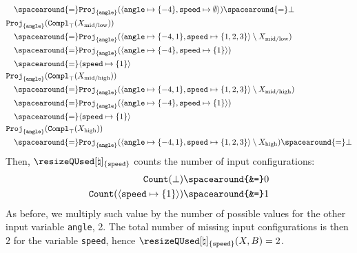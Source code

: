 \begin{example}
\begin{align*}
    &\quad\spacearound{=} \abstractdomainproject[{\{\texttt{angle}\}}](\langle \texttt{angle} \mapsto \{-4\}, \texttt{speed} \mapsto \emptyset\rangle) \spacearound{=}\abstractdomainbottom \\
    &\abstractdomainproject[{\{\texttt{angle}\}}](\abstractdomaincomplement_\abstractdomaintop(\prefrombucket[\textup{mid\-/low}])) \\
    &\quad\spacearound{=} \abstractdomainproject[{\{\texttt{angle}\}}](\langle \texttt{angle} \mapsto \{-4, 1\}, \texttt{speed} \mapsto \{1, 2, 3\} \rangle \setminus \prefrombucket[\textup{mid\-/low}]) \\
    &\quad\spacearound{=} \abstractdomainproject[{\{\texttt{angle}\}}](\langle \texttt{angle} \mapsto \{-4\}, \texttt{speed} \mapsto \{1\}\rangle) \\
    &\quad\spacearound{=} \langle \texttt{speed} \mapsto \{1\} \rangle \\
    &\abstractdomainproject[{\{\texttt{angle}\}}](\abstractdomaincomplement_\abstractdomaintop(\prefrombucket[\textup{mid\-/high}])) \\
    &\quad\spacearound{=} \abstractdomainproject[{\{\texttt{angle}\}}](\langle \texttt{angle} \mapsto \{-4, 1\}, \texttt{speed} \mapsto \{1, 2, 3\} \rangle \setminus \prefrombucket[\textup{mid\-/high}]) \\
    &\quad\spacearound{=} \abstractdomainproject[{\{\texttt{angle}\}}](\langle \texttt{angle} \mapsto \{-4\}, \texttt{speed} \mapsto \{1\}\rangle) \\
    &\quad\spacearound{=} \langle \texttt{speed} \mapsto \{1\} \rangle \\
    &\abstractdomainproject[{\{\texttt{angle}\}}](\abstractdomaincomplement_\abstractdomaintop(\prefrombucket[\textup{high}])) \\
    &\quad\spacearound{=} \abstractdomainproject[{\{\texttt{angle}\}}](\langle \texttt{angle} \mapsto \{-4, 1\}, \texttt{speed} \mapsto \{1, 2, 3\} \rangle \setminus \prefrombucket[\textup{high}]) \spacearound{=} \abstractdomainbottom
  \end{align*}
  Then, $\abstractqusedname_{\{\texttt{speed}\}}$ counts the number of input configurations:
  \begin{align*}
    \abstractdomaincount(\abstractdomainbottom) \spacearound{&=} 0 \\
    \abstractdomaincount(\langle \texttt{speed} \mapsto \{1\} \rangle) \spacearound{&=} 1 \\
  \end{align*}
  As before, we multiply such value by the number of possible values for the other input variable \texttt{angle}, \cf{} 2.
  The total number of missing input configurations is then $2$ for the variable \texttt{speed}, hence $\abstractqusedname_{\{\texttt{speed}\}}(\presfrombuckets, \buckets) = 2$.
\end{example}

